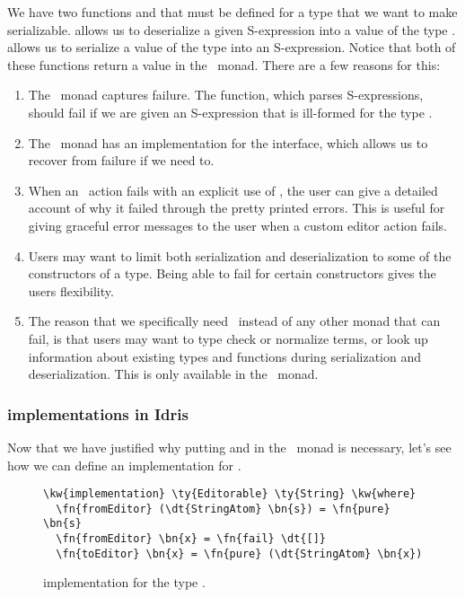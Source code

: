 We have two functions  and  that must be defined
for a type that we want to make serializable.
 allows us to deserialize a given S-expression into a value of the type .
 allows us to serialize a value of the type  into an S-expression.
Notice that both of these functions return a value in the \Elab\ monad.
There are a few reasons for this:
\begin{enumerate}
  \item The \Elab\ monad captures failure. The 
    function, which parses S-expressions, should fail if we are
    given an S-expression that is ill-formed for the type .
  \item The \Elab\ monad has an implementation for the 
    interface, which allows us to recover from failure if we need to.
  \item When an \Elab\ action fails with an explicit use of
    ,
    the user can give a detailed account of why it failed through the pretty
    printed errors. This is useful for giving graceful error messages to the
    user when a custom editor action fails.
  \item Users may want to limit both serialization and deserialization
    to some of the constructors of a type. Being able to fail for certain
    constructors gives the users flexibility.
  \item The reason that we specifically need \Elab\ instead of any other monad that can
    fail, is that users may want to type check or normalize terms, or look up
    information about existing types and functions during serialization and
    deserialization. This is only available in the \Elab\ monad.
\end{enumerate}

\subsubsection{ implementations in Idris}

Now that we have justified why putting  and 
in the \Elab\ monad is necessary,
let's see how we can define an  implementation for .

\begin{figure}[H]
\begin{Verbatim}[framesep=2mm, label=\footnotesize{\normalfont{Idris}}, labelposition=topline]
\kw{implementation} \ty{Editorable} \ty{String} \kw{where}
  \fn{fromEditor} (\dt{StringAtom} \bn{s}) = \fn{pure} \bn{s}
  \fn{fromEditor} \bn{x} = \fn{fail} \dt{[]}
  \fn{toEditor} \bn{x} = \fn{pure} (\dt{StringAtom} \bn{x})
\end{Verbatim}
\caption{ implementation for the type .}
\end{figure}


